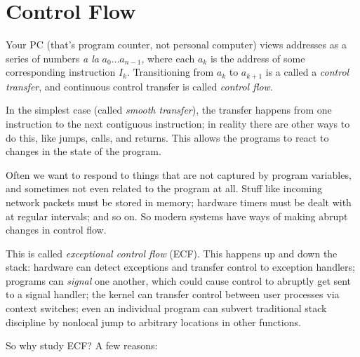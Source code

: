 \documentclass[fleqn]{article}
\begin{document}

\section{Control Flow}

Your PC (that's program counter, not personal computer) views addresses as a series of numbers \textit{a la} $a_0 \ldots a_{n-1}$, where each $a_k$ is the address of some corresponding instruction $I_k$. Transitioning from $a_k$ to $a_{k+1}$ is a called a \textit{control transfer}, and continuous control transfer is called \textit{control flow}.

In the simplest case (called \textit{smooth transfer}), the transfer happens from one instruction to the next contiguous instruction; in reality there are other ways to do this, like jumps, calls, and returns. This allows the programs to react to changes in the state of the program.

Often we want to respond to things that are not captured by program variables, and sometimes not even related to the program at all. Stuff like incoming network packets must be stored in memory; hardware timers must be dealt with at regular intervals; and so on. So modern systems have ways of making abrupt changes in control flow.

This is called \textit{exceptional control flow} (ECF). This happens up and down the stack: hardware can detect exceptions and transfer control to exception handlers; programs can \textit{signal} one another, which could cause control to abruptly get sent to a signal handler; the kernel can transfer control between user processes via context switches; even an individual program can subvert traditional stack discipline by nonlocal jump to arbitrary locations in other functions.

So why study ECF? A few reasons:
\end{document}
